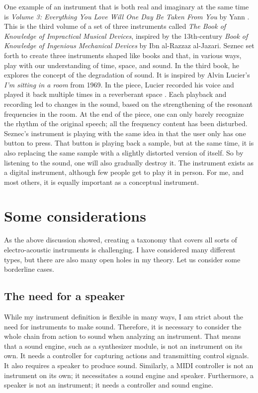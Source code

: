 One example of an instrument that is both real and imaginary at the same time is \emph{Volume 3: Everything You Love Will One Day Be Taken From You} by Yann \citet{seznec_book_2019}. This is the third volume of a set of three instruments called \emph{The Book of Knowledge of Impractical Musical Devices}, inspired by the 13th-century \emph{Book of Knowledge of Ingenious Mechanical Devices} by Ibn al-Razzaz al-Jazari. Seznec set forth to create three instruments shaped like books and that, in various ways, play with our understanding of time, space, and sound. In the third book, he explores the concept of the degradation of sound. It is inspired by Alvin Lucier's \emph{I'm sitting in a room} from 1969. In the piece, Lucier recorded his voice and played it back multiple times in a reverberant space \citep{hasse_i_2012}. Each playback and recording led to changes in the sound, based on the strengthening of the resonant frequencies in the room. At the end of the piece, one can only barely recognize the rhythm of the original speech; all the frequency content has been disturbed. Seznec's instrument is playing with the same idea in that the user only has one button to press. That button is playing back a sample, but at the same time, it is also replacing the same sample with a slightly distorted version of itself. So by listening to the sound, one will also gradually destroy it. The instrument exists as a digital instrument, although few people get to play it in person. For me, and most others, it is equally important as a conceptual instrument.


\section{Some considerations}

As the above discussion showed, creating a taxonomy that covers all sorts of electro-acoustic instruments is challenging. I have considered many different types, but there are also many open holes in my theory. Let us consider some borderline cases.


\subsection{The need for a speaker}

While my instrument definition is flexible in many ways, I am strict about the need for instruments to make sound. Therefore, it is necessary to consider the whole chain from action to sound when analyzing an instrument. That means that a sound engine, such as a synthesizer module, is not an instrument on its own. It needs a controller for capturing actions and transmitting control signals. It also requires a speaker to produce sound. Similarly, a MIDI controller is not an instrument on its own; it necessitates a sound engine and speaker. Furthermore, a speaker is not an instrument; it needs a controller and sound engine.

